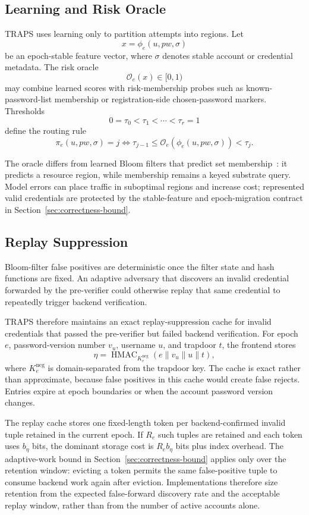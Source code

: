 \subsection{Learning and Risk Oracle}

TRAPS uses learning only to partition attempts into regions. Let
\[
x=\phi_e(u,pw,\sigma)
\]
be an epoch-stable feature vector, where \(\sigma\) denotes stable account or credential metadata. The risk oracle
\[
\mathcal{O}_e(x)\in[0,1)
\]
may combine learned scores with risk-membership probes such as known-password-list membership or registration-side chosen-password markers. Thresholds
\[
0=\tau_0<\tau_1<\cdots<\tau_r=1
\]
define the routing rule
\[
\pi_e(u,pw,\sigma)=j
\iff
\tau_{j-1}\le \mathcal{O}_e(\phi_e(u,pw,\sigma))<\tau_j.
\]

The oracle differs from learned Bloom filters that predict set membership~\cite{Mitzenmacher2018NeurIPS}: it predicts a resource region, while membership remains a keyed substrate query. Model errors can place traffic in suboptimal regions and increase cost; represented valid credentials are protected by the stable-feature and epoch-migration contract in Section~\ref{sec:correctness-bound}.

\subsection{Replay Suppression}

Bloom-filter false positives are deterministic once the filter state and hash functions are fixed. An adaptive adversary that discovers an invalid credential forwarded by the pre-verifier could otherwise replay that same credential to repeatedly trigger backend verification.

TRAPS therefore maintains an exact replay-suppression cache for invalid credentials that passed the pre-verifier but failed backend verification. For epoch \(e\), password-version number \(v_u\), username \(u\), and trapdoor \(t\), the frontend stores
\[
\eta
=
\operatorname{HMAC}_{K_e^{\mathrm{neg}}}
\left(
e \parallel v_u \parallel u \parallel t
\right),
\]
where \(K_e^{\mathrm{neg}}\) is domain-separated from the trapdoor key. The cache is exact rather than approximate, because false positives in this cache would create false rejects. Entries expire at epoch boundaries or when the account password version changes.

The replay cache stores one fixed-length token per backend-confirmed invalid tuple retained in the current epoch. If \(R_e\) such tuples are retained and each token uses \(b_{\eta}\) bits, the dominant storage cost is \(R_e b_{\eta}\) bits plus index overhead. The adaptive-work bound in Section~\ref{sec:correctness-bound} applies only over the retention window: evicting a token permits the same false-positive tuple to consume backend work again after eviction. Implementations therefore size retention from the expected false-forward discovery rate and the acceptable replay window, rather than from the number of active accounts alone.
